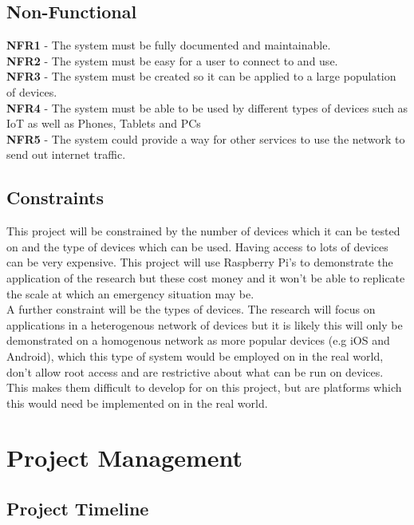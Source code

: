 \documentclass{report}
\begin{document}
\section*{Non-Functional}

\textbf{NFR1} - The system must be fully documented and maintainable.\\
\textbf{NFR2} - The system must be easy for a user to connect to and use.\\
\textbf{NFR3} - The system must be created so it can be applied to a large population of devices.\\
\textbf{NFR4} - The system must be able to be used by different types of devices such as IoT as well as Phones, Tablets and PCs\\
\textbf{NFR5} - The system could provide a way for other services to use the network to send out internet traffic.\\

\section*{Constraints}

This project will be constrained by the number of devices which it can be tested on and the type of devices which can be used. Having access 
to lots of devices can be very expensive. This project will use Raspberry Pi's to demonstrate the application of the research but these cost 
money and it won't be able to replicate the scale at which an emergency situation may be.
\bigskip\\
A further constraint will be the types of devices. The research will focus on applications in a heterogenous network of devices but it is 
likely this will only be demonstrated on a homogenous network as more popular devices (e.g iOS and Android\cite{mobileOS}), which this type of system would be employed on in the 
real world, don't allow root access and are restrictive about what can be run on devices. This makes them difficult to develop for on this project, but are platforms which 
this would need be implemented on in the real world.

\chapter*{Project Management}

\section*{Project Timeline}
\end{document}
